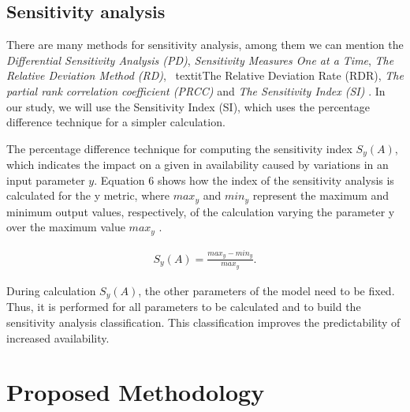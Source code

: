 \documentclass[conference]{IEEEtran}
\begin{document}
\subsection{Sensitivity analysis}

There are many methods for sensitivity analysis, among them we can mention the \textit{Differential Sensitivity Analysis (PD)}, \textit{Sensitivity Measures One at a Time}, \textit{The Relative Deviation Method (RD)}, \ textit{The Relative Deviation Rate (RDR)}, \textit{The partial rank correlation coefficient (PRCC)} and \textit{The Sensitivity Index (SI)} \citep{hamby1995comparison}. In our study, we will use the Sensitivity Index (SI), which uses the percentage difference technique for a simpler calculation.

The percentage difference technique for computing the sensitivity index $S_y(A)$, which indicates the impact on a given in availability caused by variations in an input parameter $y$. Equation 6 shows how the index of the sensitivity analysis is calculated for the y metric, where $max_y$ and $min_y$ represent the maximum and minimum output values, respectively, of the calculation varying the parameter y over the maximum value $max_y$ \citep{clemente2022availability}.

\begin{align}\label{eq:sa}
S_y(A) = \frac{max_y - min_y}{max_y}.
\end{align}

During calculation $S_y(A)$, the other parameters of the model need to be fixed. Thus, it is performed for all parameters to be calculated and to build the sensitivity analysis classification. This classification improves the predictability of increased availability.

\section{Proposed Methodology}\label{sec:methodology}
\end{document}
